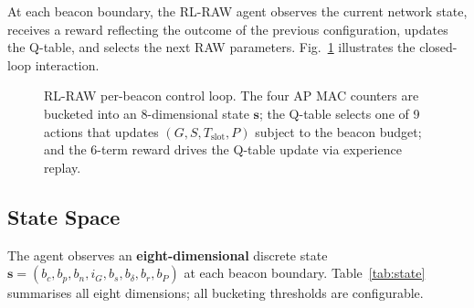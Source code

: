\documentclass[conference]{IEEEtran}
\begin{document}
At each beacon boundary, the RL-RAW agent observes the current network
state, receives a reward reflecting the outcome of the previous configuration,
updates the Q-table, and selects the next RAW parameters.
Fig.~\ref{fig:rl_loop} illustrates the closed-loop interaction.

\begin{figure}[t]
\centering
{}
\caption{RL-RAW per-beacon control loop. The four AP MAC counters are
  bucketed into an 8-dimensional state $\mathbf{s}$; the Q-table selects one
  of 9 actions that updates $(G,S,T_\text{slot},P)$ subject to the beacon
  budget; and the 6-term reward drives the Q-table update via experience
  replay.}
\label{fig:rl_loop}
\end{figure}

\subsection{State Space}

The agent observes an \textbf{eight-dimensional} discrete state
$\mathbf{s} = (b_c, b_p, b_n, i_G, b_s, b_\delta, b_r, b_P)$
at each beacon boundary.
Table~\ref{tab:state} summarises all eight dimensions; all bucketing
thresholds are configurable.
\end{document}
